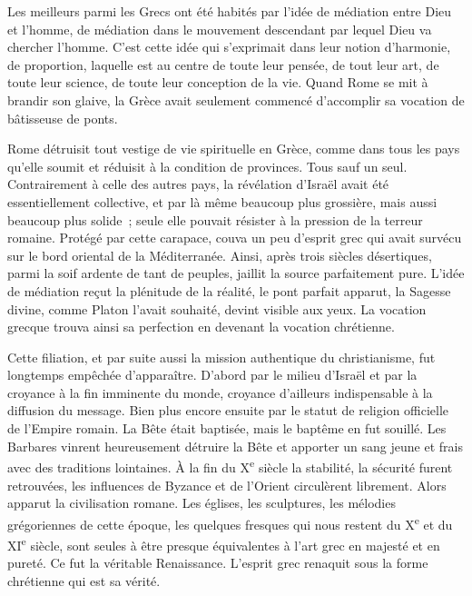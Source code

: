 \documentclass[french,twoside]{book} %
\begin{document}
Les meilleurs parmi les Grecs ont été habités par l'idée de médiation entre Dieu et l'homme, de médiation dans le mouvement descendant par lequel Dieu va chercher l'homme. C'est cette idée qui s'exprimait dans leur notion d'harmonie, de proportion, laquelle est au centre de toute leur pensée, de tout leur art, de toute leur science, de toute leur conception de la vie. Quand Rome se mit à brandir son glaive, la Grèce avait seulement commencé d'accomplir sa vocation de bâtisseuse de ponts.\par
Rome détruisit tout vestige de vie spirituelle en Grèce, comme dans tous les pays qu'elle soumit et réduisit à la condition de provinces. Tous sauf un seul. Contrairement à celle des autres pays, la révélation d'Israël avait été essentiellement collective, et par là même beaucoup plus grossière, mais aussi beaucoup plus solide ; seule elle pouvait résister à la pression de la terreur romaine. Protégé par cette carapace, couva un peu d'esprit grec qui avait survécu sur le bord oriental de la Méditerranée. Ainsi, après trois siècles désertiques, parmi la soif ardente de tant de peuples, jaillit la source parfaite­ment pure. L'idée de médiation reçut la plénitude de la réalité, le pont parfait apparut, la Sagesse divine, comme Platon l'avait souhaité, devint visible aux yeux. La vocation grecque trouva ainsi sa perfection en devenant la vocation chrétienne.\par
Cette filiation, et par suite aussi la mission authentique du christianisme, fut longtemps empêchée d'apparaître. D'abord par le milieu d'Israël et par la croyance à la fin imminente du monde, croyance d'ailleurs indispensable à la diffusion du message. Bien plus encore ensuite par le statut de religion officielle de l'Empire romain. La Bête était baptisée, mais le baptême en fut souillé. Les Barbares vinrent heureusement détruire la Bête et apporter un sang jeune et frais avec des traditions lointaines. À la fin du X\textsuperscript{e} siècle la stabilité, la sécurité furent retrouvées, les influences de Byzance et de l'Orient circulèrent librement. Alors apparut la civilisation romane. Les églises, les sculptures, les mélodies grégoriennes de cette époque, les quelques fresques qui nous restent du X\textsuperscript{e} et du XI\textsuperscript{e} siècle, sont seules à être presque équivalentes à l'art grec en majesté et en pureté. Ce fut la véritable Renaissance. L'esprit grec renaquit sous la forme chrétienne qui est sa vérité.\par
\end{document}
